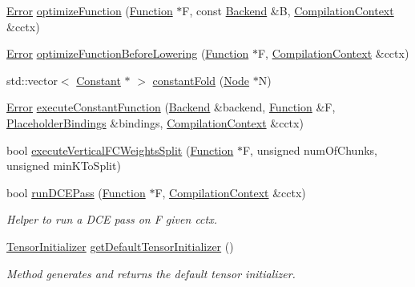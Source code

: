 \begin{DoxyCompactItemize}
\hyperlink{namespaceglow_afdb176c3a672ef66db0ecfc19a8d39bf}{Error} \hyperlink{namespaceglow_af6b48e8310d02c29962b5469885b3a75}{optimize\+Function} (\hyperlink{classglow_1_1_function}{Function} $\ast$F, const \hyperlink{classglow_1_1_backend}{Backend} \&B, \hyperlink{structglow_1_1_compilation_context}{Compilation\+Context} \&cctx)
\item 
\hyperlink{namespaceglow_afdb176c3a672ef66db0ecfc19a8d39bf}{Error} \hyperlink{namespaceglow_a2bc58f10ed9c082dab795b43217a2d51}{optimize\+Function\+Before\+Lowering} (\hyperlink{classglow_1_1_function}{Function} $\ast$F, \hyperlink{structglow_1_1_compilation_context}{Compilation\+Context} \&cctx)
\item 
std\+::vector$<$ \hyperlink{classglow_1_1_constant}{Constant} $\ast$ $>$ \hyperlink{namespaceglow_a0e523cb23b972dda0c52eb9c841a1d33}{constant\+Fold} (\hyperlink{classglow_1_1_node}{Node} $\ast$N)
\item 
\hyperlink{namespaceglow_afdb176c3a672ef66db0ecfc19a8d39bf}{Error} \hyperlink{namespaceglow_a6bf1f1f5a7c61022904299bfeee07b34}{execute\+Constant\+Function} (\hyperlink{classglow_1_1_backend}{Backend} \&backend, \hyperlink{classglow_1_1_function}{Function} \&F, \hyperlink{classglow_1_1_placeholder_bindings}{Placeholder\+Bindings} \&bindings, \hyperlink{structglow_1_1_compilation_context}{Compilation\+Context} \&cctx)
\item 
bool \hyperlink{namespaceglow_a130f47cd21711d9244adfb418ffbe9f7}{execute\+Vertical\+F\+C\+Weights\+Split} (\hyperlink{classglow_1_1_function}{Function} $\ast$F, unsigned num\+Of\+Chunks, unsigned min\+K\+To\+Split)
\item 
bool \hyperlink{namespaceglow_a70f636287069c1f7f97e401c440ae580}{run\+D\+C\+E\+Pass} (\hyperlink{classglow_1_1_function}{Function} $\ast$F, \hyperlink{structglow_1_1_compilation_context}{Compilation\+Context} \&cctx)
\begin{DoxyCompactList}\small\item\em Helper to run a D\+CE pass on {\ttfamily F} given {\ttfamily cctx}. \end{DoxyCompactList}\item 
\mbox{\label{namespaceglow_a4919335ab33be32c994fc590a146f819}} 
\hyperlink{namespaceglow_a32fc0e338408955f80a23cc7e0c0c82e}{Tensor\+Initializer} \hyperlink{namespaceglow_a4919335ab33be32c994fc590a146f819}{get\+Default\+Tensor\+Initializer} ()
\begin{DoxyCompactList}\small\item\em Method generates and returns the default tensor initializer. \end{DoxyCompactList}\item 

\end{DoxyCompactItemize}
